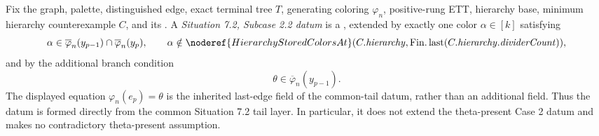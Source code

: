 \begin{definition}
Fix the graph, palette, distinguished edge, exact terminal tree \(T\),
generating coloring \(\varphi_n\), positive-rung ETT, hierarchy base,
minimum hierarchy counterexample \(C\), and its
.  A
\emph{Situation 7.2, Subcase 2.2 datum} is a
, extended by exactly one
color \(\alpha\in[k]\) satisfying
\[
 \alpha\in\overline\varphi_n(y_{p-1})\cap
              \overline\varphi_n(y_p),
 \qquad
 \alpha\notin
 \noderef{HierarchyStoredColorsAt}
   (C.\mathit{hierarchy},\operatorname{Fin.last}
      (C.\mathit{hierarchy}.\mathit{dividerCount})),
\]
and by the additional branch condition
\[
                 \theta\in\overline\varphi_n(y_{p-1}).
\]
The displayed equation \(\varphi_n(e_p)=\theta\) is the inherited
last-edge field of the common-tail datum, rather than an additional
field.
Thus the datum is formed directly from the common Situation 7.2 tail
layer.  In particular, it does not extend the theta-present Case 2 datum
and makes no contradictory theta-present assumption.
\end{definition}
